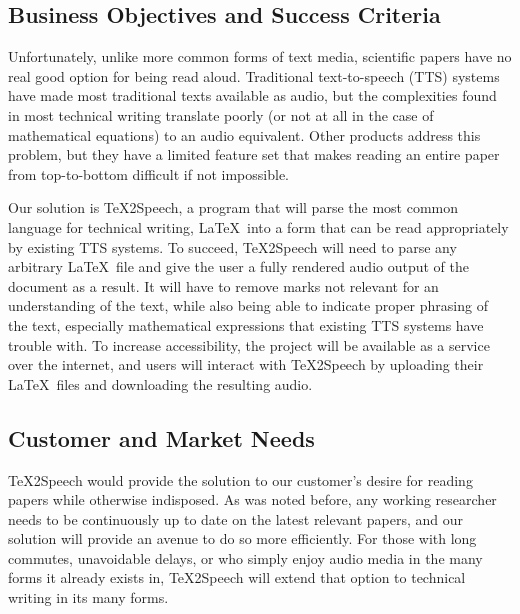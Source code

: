 \documentclass[letterpaper,12pt]{article}
\begin{document}
\subsection{Business Objectives and Success Criteria}
\par
Unfortunately, unlike more common forms of text media, scientific papers have no real good option for being read aloud. Traditional text-to-speech (TTS) systems have made most traditional texts available as audio, but the complexities found in most technical writing translate poorly (or not at all in the case of mathematical equations) to an audio equivalent. Other products address this problem, but they have a limited feature set that makes reading an entire paper from top-to-bottom difficult if not impossible.\\
\par
\noindent Our solution is \TeX 2Speech, a program that will parse the most common language for technical writing, \LaTeX\, into a form that can be read appropriately by existing TTS systems. To succeed, \TeX 2Speech will need to parse any arbitrary \LaTeX\ file and give the user a fully rendered audio output of the document as a result. It will have to remove marks not relevant for an understanding of the text, while also being able to indicate proper phrasing of the text, especially mathematical expressions that existing TTS systems have trouble with. To increase accessibility, the project will be available as a service over the internet, and users will interact with \TeX 2Speech by uploading their \LaTeX\ files and downloading the resulting audio.

\subsection{Customer and Market Needs}
\TeX 2Speech would provide the solution to our customer’s desire for reading papers while otherwise indisposed. As was noted before, any working researcher needs to be continuously up to date on the latest relevant papers, and our solution will provide an avenue to do so more efficiently. For those with long commutes, unavoidable delays, or who simply enjoy audio media in the many forms it already exists in, \TeX 2Speech will extend that option to technical writing in its many forms.
\end{document}
